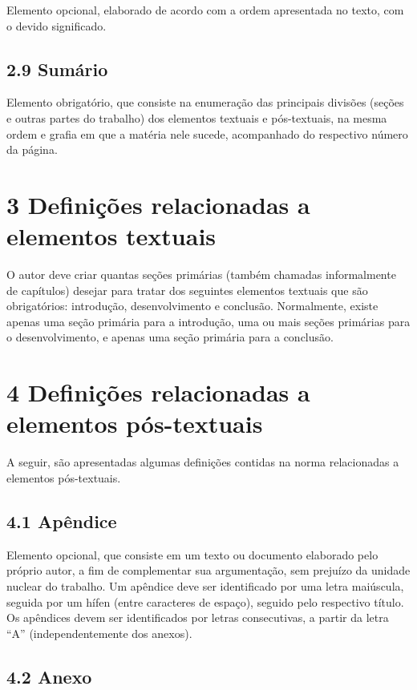 \documentclass[
	12pt,				%
	oneside,			%
	a4paper,			%
	english,			%
	brazil				%
	]{abntex2ppgsi}
\begin{document}
\begin{anexosenv}
Elemento opcional, elaborado de acordo com a ordem apresentada no texto, com o devido significado.

\subsection*{2.9 Sumário}

Elemento obrigatório, que consiste na enumeração das principais divisões (seções e outras partes do trabalho) dos elementos textuais e pós-textuais, na mesma ordem e grafia em que a matéria nele sucede, acompanhado do respectivo número da página.

\section*{3 Definições relacionadas a elementos textuais}

O autor deve criar quantas seções primárias (também chamadas informalmente de capítulos) desejar para tratar dos seguintes elementos textuais que são obrigatórios: introdução, desenvolvimento e conclusão. Normalmente, existe apenas uma seção primária para a introdução, uma ou mais seções primárias para o desenvolvimento, e apenas uma seção primária para a conclusão.

\section*{4 Definições relacionadas a elementos pós-textuais}

A seguir, são apresentadas algumas definições contidas na norma relacionadas a elementos pós-textuais.

\subsection*{4.1 Apêndice}

Elemento opcional, que consiste em um texto ou documento elaborado pelo próprio autor, a fim de complementar sua argumentação, sem prejuízo da unidade nuclear do trabalho. Um apêndice deve ser identificado por uma letra maiúscula, seguida por um hífen (entre caracteres de espaço), seguido pelo respectivo título. Os apêndices devem ser identificados por letras consecutivas, a partir da letra ``A'' (independentemente dos anexos).

\subsection*{4.2 Anexo}


\end{anexosenv}
\end{document}
